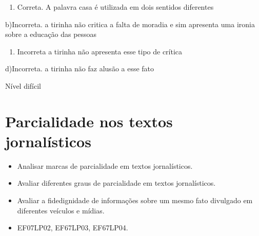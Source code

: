 \begin{enumerate}
\def\labelenumi{\arabic{enumi}.}
\tightlist
\item
  Correta. A palavra casa é utilizada em dois sentidos diferentes
\end{enumerate}

b)Incorreta. a tirinha não critica a falta de moradia e sim apresenta
uma ironia sobre a educação das pessoas

\begin{enumerate}
\def\labelenumi{\arabic{enumi}.}
\tightlist
\item
  Incorreta a tirinha não apresenta esse tipo de crítica
\end{enumerate}

d)Incorreta. a tirinha não faz alusão a esse fato

Nível difícil


\chapter{Parcialidade nos textos jornalísticos}


\begin{itemize}

  \item Analisar marcas de parcialidade em textos jornalísticos.

  \item Avaliar diferentes graus de parcialidade em textos jornalísticos.

  \item Avaliar a fidedignidade de informações sobre um mesmo fato divulgado 
  em diferentes veículos e mídias.

\end{itemize}


\begin{itemize}

  \item EF07LP02, EF67LP03, EF67LP04.

\end{itemize}


